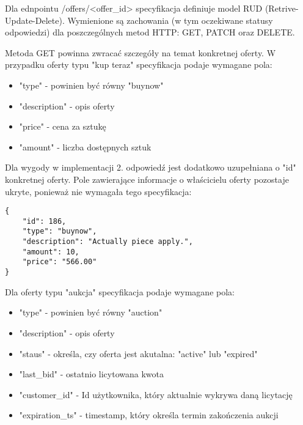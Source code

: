 \documentclass[12pt, notitlepage]{article}
\begin{document}
Dla ednpointu /offers/<offer\_id> specyfikacja definiuje model RUD (Retrive-Update-Delete). Wymienione są zachowania (w tym oczekiwane statusy odpowiedzi) dla poszczególnych metod HTTP: GET, PATCH oraz DELETE.

Metoda GET powinna zwracać szczegóły na temat konkretnej oferty. W przypadku oferty typu "kup teraz" specyfikacja podaje wymagane pola: 
\begin{itemize}
    \item "type" - powinien być równy "buynow"
    \item "description" - opis oferty
    \item "price" - cena za sztukę
    \item "amount" - liczba dostępnych sztuk
\end{itemize}

Dla wygody w implementacji 2. odpowiedź jest dodatkowo uzupełniana o "id" konkretnej oferty. Pole zawierające informacje o właścicielu oferty pozostaje ukryte, ponieważ nie wymagała tego specyfikacja:
\begin{lstlisting}
{
    "id": 186,
    "type": "buynow",
    "description": "Actually piece apply.",
    "amount": 10,
    "price": "566.00"
}
\end{lstlisting}

Dla oferty typu "aukcja" specyfikacja podaje wymagane pola: 
\begin{itemize}
    \item "type" - powinien być równy "auction"
    \item "description" - opis oferty
    \item "staus" - określa, czy oferta jest akutalna: "active" lub "expired"
    \item "last\_bid" - ostatnio licytowana kwota
    \item "customer\_id" - Id użytkownika, który aktualnie wykrywa daną licytację
    \item "expiration\_ts" - timestamp, który określa termin zakończenia aukcji
\end{itemize}
\end{document}
